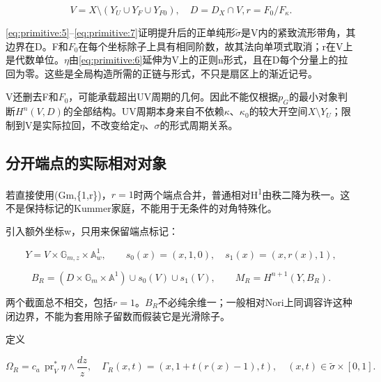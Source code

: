 \documentclass[11pt,a4paper,oneside]{ctexart}
\theoremstyle{cnplain}
\theoremstyle{definition}
\theoremstyle{remark}
\numberwithin{equation}{section}
\begin{document}
\begin{equation}
V=X\setminus(Y_U\cup Y_F\cup Y_{F0}),\quad D=D_X\cap V,
                         r=F_0/F_\kappa.                         \label{eq:primitive:9}
\end{equation}

\eqref{eq:primitive:5}--\eqref{eq:primitive:7}证明提升后的正单纯形\(\widetilde\sigma\)是V内的紧致流形带角，其边界在D。F和\(F_0\)在每个坐标除子上具有相同阶数，故其法向单项式取消；r在V上是代数单位。\(\eta \)由\eqref{eq:primitive:6}延伸为V上的正则n形式，且在D每个分量上的拉回为零。这些是全局构造所需的正链与形式，不只是扇区上的渐近记号。

V还删去F和\(F_0\)，可能承载超出UV周期的几何。因此不能仅根据\(p_G\)的最小对象判断\(H^n(V,D)\)的全部结构。UV周期本身来自不依赖\(\kappa \)、\(\kappa _0\)的较大开空间\(X\setminus Y_U\)；限制到V是实际拉回，不改变给定\(\eta \)、\(\sigma \)的形式周期关系。


\subsection{分开端点的实际相对对象}\label{sec:primitive:4}

若直接使用(Gm,\{1,r\})，\(r=1\)时两个端点合并，普通相对H\textsuperscript{1}由秩二降为秩一。这不是保持标记的Kummer家庭，不能用于无条件的对角特殊化。

引入额外坐标w，只用来保留端点标记：

\begin{equation}
Y=V\times\mathbb G_{m,z}\times\mathbb A^1_w,\qquad
 s_0(x)=(x,1,0),\quad s_1(x)=(x,r(x),1),
\end{equation}

\begin{equation}
B_R=(D\times\mathbb G_m\times\mathbb A^1)
                          \cup s_0(V)\cup s_1(V),\qquad
                M_R=H^{n+1}(Y,B_R).                              \label{eq:primitive:10}
\end{equation}

两个截面总不相交，包括\(r=1\)。\(B_R\)不必纯余维一；一般相对Nori上同调容许这种闭边界，不能为套用除子留数而假装它是光滑除子。

定义

\begin{equation}
\Omega_R=c_a\,\operatorname{pr}_V^*\eta\wedge\frac{dz}{z},
\quad\Gamma_R(x,t)=(x,1+t(r(x)-1),t),\quad
 (x,t)\in\widetilde\sigma\times[0,1].                            \label{eq:primitive:11}
\end{equation}
\end{document}
